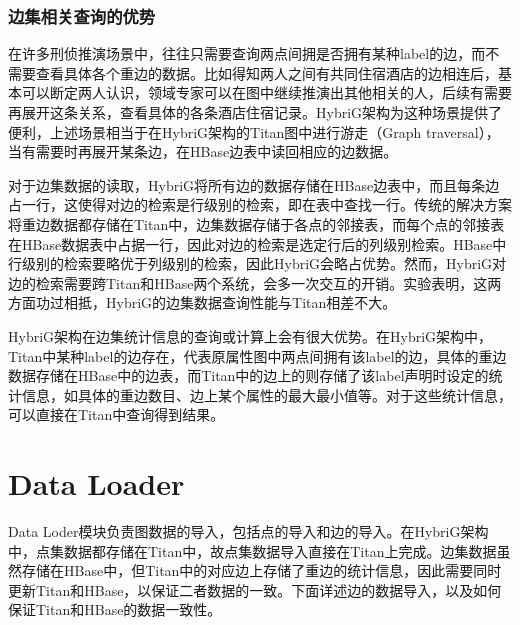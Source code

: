 \subsubsection{边集相关查询的优势}
在许多刑侦推演场景中，往往只需要查询两点间拥是否拥有某种label的边，而不需要查看具体各个重边的数据。比如得知两人之间有共同住宿酒店的边相连后，基本可以断定两人认识，领域专家可以在图中继续推演出其他相关的人，后续有需要再展开这条关系，查看具体的各条酒店住宿记录。HybriG架构为这种场景提供了便利，上述场景相当于在HybriG架构的Titan图中进行游走（Graph traversal），当有需要时再展开某条边，在HBase边表中读回相应的边数据。

对于边集数据的读取，HybriG将所有边的数据存储在HBase边表中，而且每条边占一行，这使得对边的检索是行级别的检索，即在表中查找一行。传统的解决方案将重边数据都存储在Titan中，边集数据存储于各点的邻接表，而每个点的邻接表在HBase数据表中占据一行，因此对边的检索是选定行后的列级别检索。HBase中行级别的检索要略优于列级别的检索，因此HybriG会略占优势。然而，HybriG对边的检索需要跨Titan和HBase两个系统，会多一次交互的开销。实验表明，这两方面功过相抵，HybriG的边集数据查询性能与Titan相差不大。

HybriG架构在边集统计信息的查询或计算上会有很大优势。在HybriG架构中，Titan中某种label的边存在，代表原属性图中两点间拥有该label的边，具体的重边数据存储在HBase中的边表，而Titan中的边上的则存储了该label声明时设定的统计信息，如具体的重边数目、边上某个属性的最大最小值等。对于这些统计信息，可以直接在Titan中查询得到结果。


\section{Data Loader}
Data Loder模块负责图数据的导入，包括点的导入和边的导入。在HybriG架构中，点集数据都存储在Titan中，故点集数据导入直接在Titan上完成。边集数据虽然存储在HBase中，但Titan中的对应边上存储了重边的统计信息，因此需要同时更新Titan和HBase，以保证二者数据的一致。下面详述边的数据导入，以及如何保证Titan和HBase的数据一致性。

